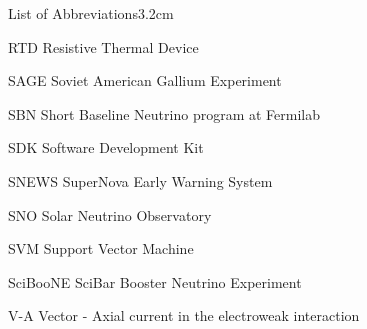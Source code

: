 \begin{mclistof}{List of Abbreviations}{3.2cm}
\item[RTD] Resistive Thermal Device
\item[SAGE] Soviet American Gallium Experiment
\item[SBN] Short Baseline Neutrino program at Fermilab
\item[SDK] Software Development Kit
\item[SNEWS] SuperNova Early Warning System
\item[SNO] Solar Neutrino Observatory
\item[SVM] Support Vector Machine
\item[SciBooNE] SciBar Booster Neutrino Experiment
\item[V-A] Vector - Axial current in the electroweak interaction


\end{mclistof} 
